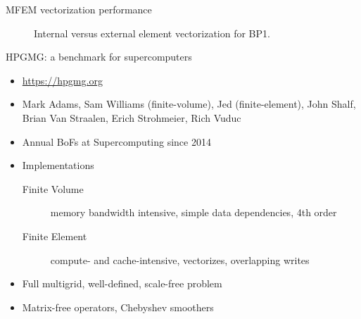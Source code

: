 \documentclass[aspectratio=169]{beamer}
\begin{document}
\begin{frame}{MFEM vectorization performance}
  \begin{figure}%
    \centering
    \caption{Internal versus external element vectorization for BP1.}
  \end{figure}
\end{frame}

\begin{frame}{HPGMG: a benchmark for supercomputers}
  \begin{itemize}
  \item \url{https://hpgmg.org}
  \item Mark Adams, Sam Williams (finite-volume), Jed (finite-element), John Shalf, Brian Van Straalen, Erich Strohmeier, Rich Vuduc
  \item Annual BoFs at Supercomputing since 2014
  \item Implementations
    \begin{description}
    \item[Finite Volume] memory bandwidth intensive, simple data dependencies, 4th order
    \item[Finite Element] compute- and cache-intensive, vectorizes, overlapping writes
    \end{description}
  \item Full multigrid, well-defined, scale-free problem
  \item Matrix-free operators, Chebyshev smoothers
  \end{itemize}
\end{frame}
\end{document}
